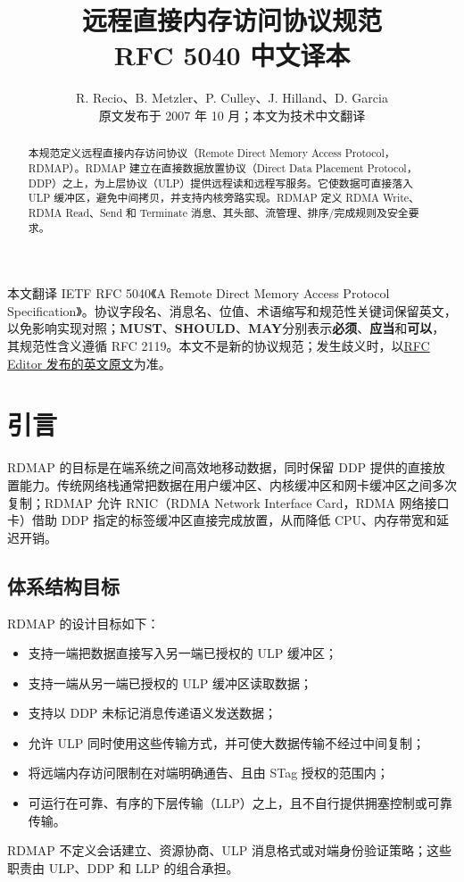 \documentclass[11pt,a4paper]{article}
\title{\textbf{远程直接内存访问协议规范}\\[4pt]\large RFC 5040 中文译本}
\author{R. Recio、B. Metzler、P. Culley、J. Hilland、D. Garcia\\\small 原文发布于 2007 年 10 月；本文为技术中文翻译}
\date{}
\newcommand{\MUST}{\textbf{MUST}}
\newcommand{\SHOULD}{\textbf{SHOULD}}
\newcommand{\MAY}{\textbf{MAY}}
\begin{document}
\maketitle
\begin{tcolorbox}[colback=rfcgray,colframe=rfcblue,title=译本说明]
本文翻译 IETF RFC 5040《A Remote Direct Memory Access Protocol Specification》。协议字段名、消息名、位值、术语缩写和规范性关键词保留英文，以免影响实现对照；\MUST、\SHOULD、\MAY 分别表示\textbf{必须}、\textbf{应当}和\textbf{可以}，其规范性含义遵循 RFC 2119。本文不是新的协议规范；发生歧义时，以\href{https://www.rfc-editor.org/rfc/rfc5040.txt}{RFC Editor 发布的英文原文}为准。
\end{tcolorbox}
\begin{abstract}
本规范定义远程直接内存访问协议（Remote Direct Memory Access Protocol，RDMAP）。RDMAP 建立在直接数据放置协议（Direct Data Placement Protocol，DDP）之上，为上层协议（ULP）提供远程读和远程写服务。它使数据可直接落入 ULP 缓冲区，避免中间拷贝，并支持内核旁路实现。RDMAP 定义 RDMA Write、RDMA Read、Send 和 Terminate 消息、其头部、流管理、排序/完成规则及安全要求。
\end{abstract}
\tableofcontents
\newpage
\section{引言}
RDMAP 的目标是在端系统之间高效地移动数据，同时保留 DDP 提供的直接放置能力。传统网络栈通常把数据在用户缓冲区、内核缓冲区和网卡缓冲区之间多次复制；RDMAP 允许 RNIC（RDMA Network Interface Card，RDMA 网络接口卡）借助 DDP 指定的标签缓冲区直接完成放置，从而降低 CPU、内存带宽和延迟开销。
\subsection{体系结构目标}
RDMAP 的设计目标如下：
\begin{itemize}
\item 支持一端把数据直接写入另一端已授权的 ULP 缓冲区；
\item 支持一端从另一端已授权的 ULP 缓冲区读取数据；
\item 支持以 DDP 未标记消息传递语义发送数据；
\item 允许 ULP 同时使用这些传输方式，并可使大数据传输不经过中间复制；
\item 将远端内存访问限制在对端明确通告、且由 STag 授权的范围内；
\item 可运行在可靠、有序的下层传输（LLP）之上，且不自行提供拥塞控制或可靠传输。
\end{itemize}
RDMAP 不定义会话建立、资源协商、ULP 消息格式或对端身份验证策略；这些职责由 ULP、DDP 和 LLP 的组合承担。
\end{document}
